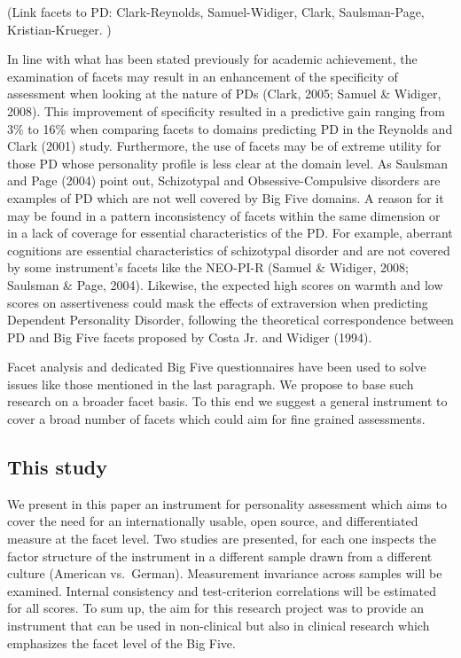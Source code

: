 \documentclass[man]{apa6}
\theoremstyle{definition}
\theoremstyle{definition}
\theoremstyle{definition}
\theoremstyle{remark}
\begin{document}
(Link facets to PD: Clark-Reynolds, Samuel-Widiger, Clark,
Saulsman-Page, Kristian-Krueger. )

In line with what has been stated previously for academic achievement,
the examination of facets may result in an enhancement of the
specificity of assessment when looking at the nature of PDs (Clark,
2005; Samuel \& Widiger, 2008). This improvement of specificity resulted
in a predictive gain ranging from 3\% to 16\% when comparing facets to
domains predicting PD in the Reynolds and Clark (2001) study.
Furthermore, the use of facets may be of extreme utility for those PD
whose personality profile is less clear at the domain level. As Saulsman
and Page (2004) point out, Schizotypal and Obsessive-Compulsive
disorders are examples of PD which are not well covered by Big Five
domains. A reason for it may be found in a pattern inconsistency of
facets within the same dimension or in a lack of coverage for essential
characteristics of the PD. For example, aberrant cognitions are
essential characteristics of schizotypal disorder and are not covered by
some instrument's facets like the NEO-PI-R (Samuel \& Widiger, 2008;
Saulsman \& Page, 2004). Likewise, the expected high scores on warmth
and low scores on assertiveness could mask the effects of extraversion
when predicting Dependent Personality Disorder, following the
theoretical correspondence between PD and Big Five facets proposed by
Costa Jr. and Widiger (1994).

Facet analysis and dedicated Big Five questionnaires have been used to
solve issues like those mentioned in the last paragraph. We propose to
base such research on a broader facet basis. To this end we suggest a
general instrument to cover a broad number of facets which could aim for
fine grained assessments.

\hypertarget{this-study}{%
\subsection{This study}\label{this-study}}

We present in this paper an instrument for personality assessment which
aims to cover the need for an internationally usable, open source, and
differentiated measure at the facet level. Two studies are presented,
for each one inspects the factor structure of the instrument in a
different sample drawn from a different culture (American vs.~German).
Measurement invariance across samples will be examined. Internal
consistency and test-criterion correlations will be estimated for all
scores. To sum up, the aim for this research project was to provide an
instrument that can be used in non-clinical but also in clinical
research which emphasizes the facet level of the Big Five.
\end{document}
